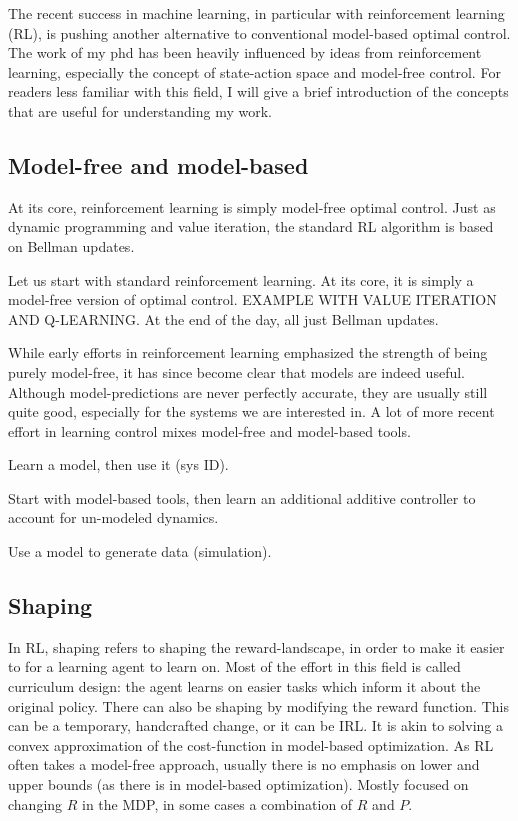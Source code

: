 The recent success in machine learning, in particular with reinforcement learning (RL), is pushing another alternative to conventional model-based optimal control. The work of my phd has been heavily influenced by ideas from reinforcement learning, especially the concept of state-action space and model-free control. For readers less familiar with this field, I will give a brief introduction of the concepts that are useful for understanding my work.

\subsection{Model-free and model-based}
At its core, reinforcement learning is simply model-free optimal control. Just as dynamic programming and value iteration, the standard RL algorithm is based on Bellman updates. 

Let us start with standard reinforcement learning. At its core, it is simply a model-free version of optimal control. EXAMPLE WITH VALUE ITERATION AND Q-LEARNING.
At the end of the day, all just Bellman updates. \par

While early efforts in reinforcement learning emphasized the strength of being purely model-free, it has since become clear that models are indeed useful. Although model-predictions are never perfectly accurate, they are usually still quite good, especially for the systems we are interested in. A lot of more recent effort in learning control mixes model-free and model-based tools. \par

Learn a model, then use it (sys ID).

Start with model-based tools, then learn an additional additive controller to account for un-modeled dynamics.

Use a model to generate data (simulation).

\subsection{Shaping}

In RL, shaping refers to shaping the reward-landscape, in order to make it easier to for a learning agent to learn on.
Most of the effort in this field is called curriculum design: the agent learns on easier tasks which inform it about the original policy.
There can also be shaping by modifying the reward function. This can be a temporary, handcrafted change, or it can be IRL.
It is akin to solving a convex approximation of the cost-function in model-based optimization. As RL often takes a model-free approach, usually there is no emphasis on lower and upper bounds (as there is in model-based optimization).
Mostly focused on changing $R$ in the MDP, in some cases a combination of $R$ and $P$.

